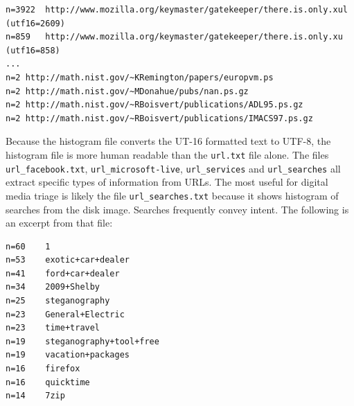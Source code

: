\lstset{style=customfile}
\begin{lstlisting}
n=3922	http://www.mozilla.org/keymaster/gatekeeper/there.is.only.xul	(utf16=2609)
n=859	http://www.mozilla.org/keymaster/gatekeeper/there.is.only.xu	(utf16=858)
...
n=2	http://math.nist.gov/~KRemington/papers/europvm.ps
n=2	http://math.nist.gov/~MDonahue/pubs/nan.ps.gz
n=2	http://math.nist.gov/~RBoisvert/publications/ADL95.ps.gz
n=2	http://math.nist.gov/~RBoisvert/publications/IMACS97.ps.gz
\end{lstlisting}
Because the histogram file converts the UT-16 formatted text to UTF-8, the histogram file is more human readable than the \texttt{url.txt} file alone. The files \texttt{url\_facebook.txt}, \texttt{url\_microsoft-live}, \texttt{url\_services} and \texttt{url\_searches} all extract specific types of information from URLs. The most useful for digital media triage is likely the file \texttt{url\_searches.txt} because it shows histogram of searches from the disk image. Searches frequently convey intent. The following is an excerpt from that file:
\lstset{style=customfile}
\begin{lstlisting}
n=60	1
n=53	exotic+car+dealer
n=41	ford+car+dealer
n=34	2009+Shelby
n=25	steganography
n=23	General+Electric
n=23	time+travel
n=19	steganography+tool+free
n=19	vacation+packages
n=16	firefox
n=16	quicktime
n=14	7zip
\end{lstlisting}


